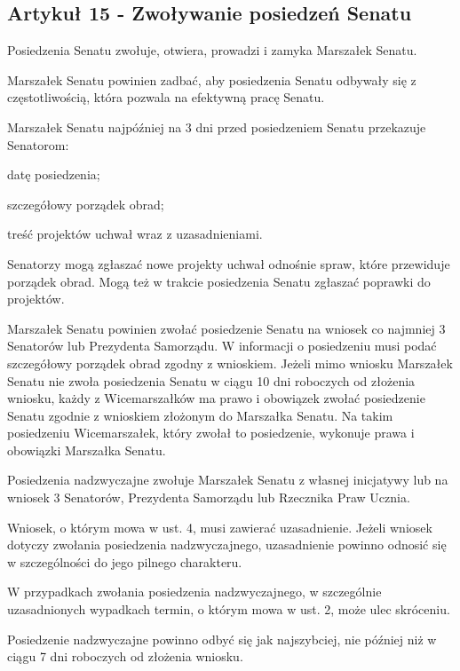 \documentclass[14pt]{article}
\newcounter{podpunktyCounter}
\newenvironment{podpunkty}
{%
	\begin{list}{\arabic{podpunktyCounter})}%
		{%
			\usecounter{podpunktyCounter}
			\setlength{\itemsep}{1pt}
			\setlength{\topsep}{3pt}
		}%
	}%
	{\end{list}}
\newenvironment{ustepy}{%
	\begin{enumerate}[leftmargin=1.5em, itemindent=1pt, labelwidth=1em, itemsep=5pt]
	}{%
	\end{enumerate}
}
\begin{document}
\subsection*{Artykuł 15 - Zwoływanie posiedzeń Senatu}
\begin{ustepy}
	\item Posiedzenia Senatu zwołuje, otwiera, prowadzi i zamyka Marszałek Senatu.
	\item Marszałek Senatu powinien zadbać, aby posiedzenia Senatu odbywały się z częstotliwością, która pozwala na efektywną pracę Senatu.
	\item Marszałek Senatu najpóźniej na 3 dni przed posiedzeniem Senatu przekazuje Senatorom:
	\begin{podpunkty}
		\item datę posiedzenia; 
		\item szczegółowy porządek obrad; 
		\item treść projektów uchwał wraz z uzasadnieniami.
	\end{podpunkty}
	\item Senatorzy mogą zgłaszać nowe projekty uchwał odnośnie spraw, które przewiduje porządek obrad. Mogą też w trakcie posiedzenia Senatu zgłaszać poprawki do projektów.
	\item Marszałek Senatu powinien zwołać posiedzenie Senatu na wniosek co najmniej 3 Senatorów lub Prezydenta Samorządu. W informacji o posiedzeniu musi podać szczegółowy porządek obrad zgodny z wnioskiem. Jeżeli mimo wniosku Marszałek Senatu nie zwoła posiedzenia Senatu w ciągu 10 dni roboczych od złożenia wniosku, każdy z Wicemarszałków ma prawo i obowiązek zwołać posiedzenie Senatu zgodnie z wnioskiem złożonym do Marszałka Senatu. Na takim posiedzeniu Wicemarszałek, który zwołał to posiedzenie, wykonuje prawa i obowiązki Marszałka Senatu.
	\item Posiedzenia nadzwyczajne zwołuje Marszałek Senatu z własnej inicjatywy lub na wniosek 3 Senatorów, Prezydenta Samorządu lub Rzecznika Praw Ucznia.
	\item Wniosek, o którym mowa w ust. 4, musi zawierać uzasadnienie. Jeżeli wniosek dotyczy zwołania posiedzenia nadzwyczajnego, uzasadnienie powinno odnosić się w szczególności do jego pilnego charakteru.
	\item W przypadkach zwołania posiedzenia nadzwyczajnego, w szczególnie uzasadnionych wypadkach termin, o którym mowa w ust. 2, może ulec skróceniu.
	\item Posiedzenie nadzwyczajne powinno odbyć się jak najszybciej, nie później niż w ciągu 7 dni roboczych od złożenia wniosku.
\end{ustepy}
\end{document}
